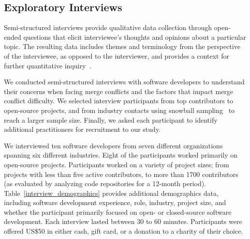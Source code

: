 \subsection{Exploratory Interviews}\label{interviews}

Semi-structured interviews provide qualitative data collection through open-ended questions that elicit interviewee's thoughts and opinions about a particular topic.
The resulting data includes themes and terminology from the perspective of the interviewee, as opposed to the interviewer, and provides a context for further quantitative inquiry~\cite{easterbrook2008selecting}.

We conducted semi-structured interviews with software developers to understand their concerns when facing merge conflicts and the factors that impact merge conflict difficulty.
We selected interview participants from top contributors to open-source projects, and from industry contacts using snowball sampling~\cite{goodman1961snowball} to reach a larger sample size.
Finally, we asked each participant to identify additional practitioners for recruitment to our study.

We interviewed ten software developers from seven different organizations spanning six different industries.
Eight of the participants worked primarily on open-source projects.
Participants worked on a variety of project sizes; from projects with less than five active contributors, to more than 1700 contributors (as evaluated by analyzing code repositories for a 12-month period).
Table~\ref{interview_demographics} provides additional demographics data, including software development experience, role, industry, project size, and whether the participant primarily focused on open- or closed-source software development.
Each interview lasted between 30 to 60 minutes.
Participants were offered US\$50 in either cash, gift card, or a donation to a charity of their choice.

